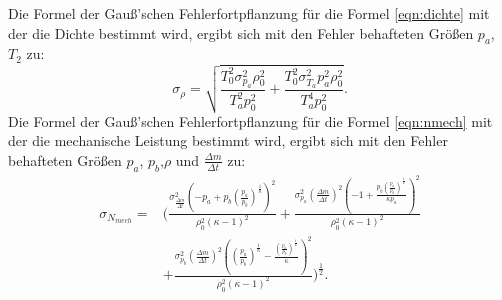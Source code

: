 Die Formel der Gauß'schen Fehlerfortpflanzung für die Formel \ref{eqn:dichte} mit der die Dichte bestimmt wird, ergibt sich mit den Fehler behafteten Größen 
$p_a$, $T_2$ zu:
\begin{equation}
 \sigma_{\rho} =\sqrt{\frac{T_{0}^{2} \sigma_{p_{a}}^{2} \rho_{0}^{2}}{T_{a}^{2} p_{0}^{2}} + \frac{T_{0}^{2} \sigma_{T_{a}}^{2} p_{a}^{2} \rho_{0}^{2}}{T_{a}^{4} p_{0}^{2}}}.
    \label{eq:dichteFehler}
\end{equation}
Die Formel der Gauß'schen Fehlerfortpflanzung für die Formel \ref{eqn:nmech} mit der die mechanische Leistung bestimmt wird, ergibt sich mit den Fehler behafteten Größen 
$p_a$, $p_b$,$\rho$ und $\frac{\Delta m}{\Delta t}$ zu:
\begin{equation}
    \begin{split}
        \sigma_{N_{mech}}= {} & \Biggl(\frac{\sigma_{\frac{\Delta m}{\Delta t}}^{2} \left(- p_{a} + p_{b} \left(\frac{p_{a}}{p_{b}}\right)^{\frac{1}{\kappa}}\right)^{2}}{\rho_{0}^{2} \left(\kappa - 1\right)^{2}} 
            + \frac{\sigma_{p_{a}}^{2} \left(\frac{\Delta m}{\Delta t}\right)^{2} \left(-1 + \frac{p_{b} \left(\frac{p_{a}}{p_{b}}\right)^{\frac{1}{\kappa}}}{\kappa p_{a}}\right)^{2}}{\rho_{0}^{2} \left(\kappa - 1\right)^{2}} \\ 
                       & + \frac{\sigma_{p_{b}}^{2} \left(\frac{\Delta m}{\Delta t}\right)^{2} \left(\left(\frac{p_{a}}{p_{b}}\right)^{\frac{1}{\kappa}} - \frac{\left(\frac{p_{a}}{p_{b}}\right)^{\frac{1}{\kappa}}}{\kappa}\right)^{2}}{\rho_{0}^{2} \left(\kappa - 1\right)^{2}} \Biggr)^{\frac{1}{2}}.
    \end{split}
    \label{eq:nmechFehler}
\end{equation}
